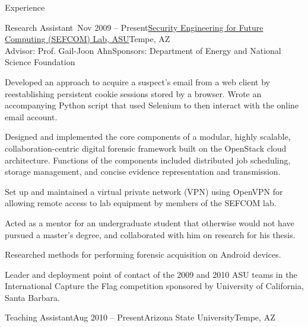 \documentclass{resume} %
\begin{document}
\begin{rSection}{Experience}


\begin{rSubsection}{Research Assistant~}{Nov 2009 -- Present}{\href{http://sefcom.asu.edu/}{Security Engineering for Future Computing (SEFCOM) Lab, ASU}}{Tempe, AZ\\{\textnormal{Advisor: Prof. Gail-Joon Ahn\hfill Sponsors: Department of Energy and National Science Foundation}}}

	\item Developed an approach to acquire a suspect's email from a web client by reestablishing persistent cookie sessions stored by a browser. Wrote an accompanying Python script that used Selenium to then interact with the online email account.
	
	\item Designed and implemented the core components of a modular, highly scalable, collaboration-centric digital forensic framework built on the OpenStack cloud architecture. Functions of the components included distributed job scheduling, storage management, and concise evidence representation and transmission.
	
	\item Set up and maintained a virtual private network (VPN) using OpenVPN for allowing remote access to lab equipment by members of the SEFCOM lab.
	
	\item Acted as a mentor for an undergraduate student that otherwise would not have pursued a master's degree, and collaborated with him on research for his thesis.
	
	\item Researched methods for performing forensic acquisition on Android devices.
	
	\item Leader and deployment point of contact of the 2009 and 2010 ASU teams in the International Capture the Flag competition sponsored by University of California, Santa Barbara.
	
\end{rSubsection}


\begin{rSubsection}{Teaching Assistant}{Aug 2010 -- Present}{Arizona State University}{Tempe, AZ}


\end{rSubsection}
\end{rSection}
\end{document}
